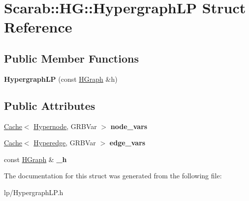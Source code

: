 \hypertarget{structScarab_1_1HG_1_1HypergraphLP}{
\section{Scarab::HG::HypergraphLP Struct Reference}
\label{structScarab_1_1HG_1_1HypergraphLP}
}
\subsection*{Public Member Functions}
\begin{DoxyCompactItemize}
\item 
\hypertarget{structScarab_1_1HG_1_1HypergraphLP_a332edf79e5fc5b617ec6e948a73cc4a4}{
{\bfseries HypergraphLP} (const \hyperlink{classScarab_1_1HG_1_1HGraph}{HGraph} \&h)}
\label{structScarab_1_1HG_1_1HypergraphLP_a332edf79e5fc5b617ec6e948a73cc4a4}

\end{DoxyCompactItemize}
\subsection*{Public Attributes}
\begin{DoxyCompactItemize}
\item 
\hypertarget{structScarab_1_1HG_1_1HypergraphLP_ae9c9c441b112e98e412e8129e91a28ce}{
\hyperlink{classCache}{Cache}$<$ \hyperlink{classScarab_1_1HG_1_1Hypernode}{Hypernode}, GRBVar $>$ {\bfseries node\_\-vars}}
\label{structScarab_1_1HG_1_1HypergraphLP_ae9c9c441b112e98e412e8129e91a28ce}

\item 
\hypertarget{structScarab_1_1HG_1_1HypergraphLP_a8e71b062f3d6691eef27bb85c718604f}{
\hyperlink{classCache}{Cache}$<$ \hyperlink{classScarab_1_1HG_1_1Hyperedge}{Hyperedge}, GRBVar $>$ {\bfseries edge\_\-vars}}
\label{structScarab_1_1HG_1_1HypergraphLP_a8e71b062f3d6691eef27bb85c718604f}

\item 
\hypertarget{structScarab_1_1HG_1_1HypergraphLP_a52fa717afa9c902f7d8ef3adf18c5204}{
const \hyperlink{classScarab_1_1HG_1_1HGraph}{HGraph} \& {\bfseries \_\-h}}
\label{structScarab_1_1HG_1_1HypergraphLP_a52fa717afa9c902f7d8ef3adf18c5204}

\end{DoxyCompactItemize}


The documentation for this struct was generated from the following file:\begin{DoxyCompactItemize}
\item 
lp/HypergraphLP.h\end{DoxyCompactItemize}

